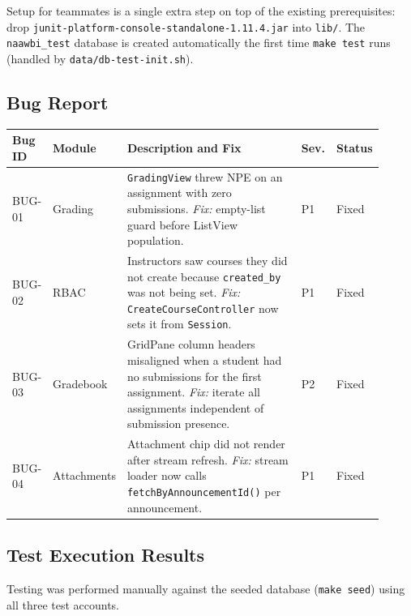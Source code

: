 \documentclass[12pt, a4paper]{article}
\begin{document}
\noindent
Setup for teammates is a single extra step on top of the existing
prerequisites: drop \texttt{junit-platform-console-standalone-1.11.4.jar}
into \texttt{lib/}. The \texttt{naawbi\_test} database is created
automatically the first time \texttt{make test} runs (handled by
\texttt{data/db-test-init.sh}).

\subsection{Bug Report}

\begin{center}\footnotesize\sloppy
\begin{tabular}{@{}p{0.07\linewidth}p{0.11\linewidth}p{0.60\linewidth}p{0.06\linewidth}p{0.07\linewidth}@{}}
  \toprule
  \textbf{Bug ID} & \textbf{Module} & \textbf{Description and Fix} & \textbf{Sev.} & \textbf{Status} \\
  \midrule
  BUG-01 & Grading     & \texttt{GradingView} threw NPE on an assignment with zero submissions. \emph{Fix:} empty-list guard before ListView population.                                            & P1 & \textcolor{success}{Fixed} \\
  BUG-02 & RBAC        & Instructors saw courses they did not create because \texttt{created\_by} was not being set. \emph{Fix:} \texttt{CreateCourseController} now sets it from \texttt{Session}.     & P1 & \textcolor{success}{Fixed} \\
  BUG-03 & Gradebook   & GridPane column headers misaligned when a student had no submissions for the first assignment. \emph{Fix:} iterate all assignments independent of submission presence.        & P2 & \textcolor{success}{Fixed} \\
  BUG-04 & Attachments & Attachment chip did not render after stream refresh. \emph{Fix:} stream loader now calls \texttt{fetchByAnnouncementId()} per announcement. & P1 & \textcolor{success}{Fixed} \\
  \bottomrule
\end{tabular}
\end{center}

\subsection{Test Execution Results}

Testing was performed manually against the seeded database (\texttt{make seed})
using all three test accounts.
\end{document}
